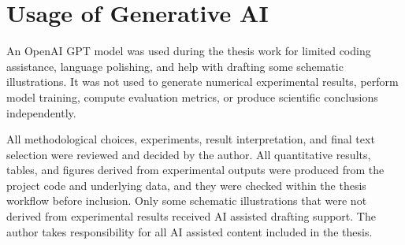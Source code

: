 \section{Usage of Generative AI}
\noindent An OpenAI GPT model was used during the thesis work for limited coding assistance, language polishing, and help with drafting some schematic illustrations. It was not used to generate numerical experimental results, perform model training, compute evaluation metrics, or produce scientific conclusions independently.

\noindent All methodological choices, experiments, result interpretation, and final text selection were reviewed and decided by the author. All quantitative results, tables, and figures derived from experimental outputs were produced from the project code and underlying data, and they were checked within the thesis workflow before inclusion. Only some schematic illustrations that were not derived from experimental results received AI assisted drafting support. The author takes responsibility for all AI assisted content included in the thesis.
